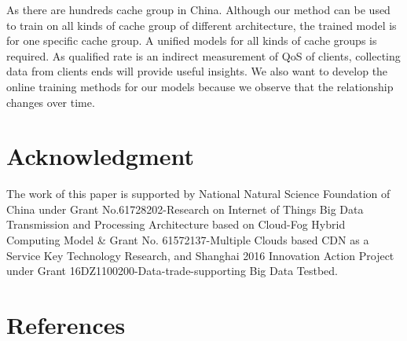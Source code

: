 \documentclass[5p]{elsarticle}
\begin{document}
As there are hundreds cache group in China. Although our method can be used to train on all kinds of cache group of different architecture, the trained model is for one specific cache group. A unified models for all kinds of cache groups is required. As qualified rate is an indirect measurement of QoS of clients, collecting data from clients ends will provide useful insights. We also want to develop the online training methods for our models because we observe that the relationship changes over time.

\section{Acknowledgment}
The work of this paper is supported by National Natural Science Foundation of China under Grant No.61728202-Research on Internet of Things Big Data Transmission and Processing Architecture based on Cloud-Fog Hybrid Computing Model & Grant No. 61572137-Multiple Clouds based CDN as a Service Key Technology Research, and Shanghai 2016 Innovation Action Project under Grant 16DZ1100200-Data-trade-supporting Big Data Testbed.


\section*{References}


\end{document}
